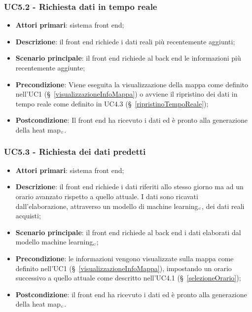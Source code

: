 \subsubsection{UC5.2 - Richiesta dati in tempo reale}\label{richiestaDatiTempoReale}
\begin{itemize}
	\item \textbf{Attori primari}: sistema front end;
	\item \textbf{Descrizione}: il front end richiede i dati reali più recentemente aggiunti;
	\item \textbf{Scenario principale}: il front end richiede al back end le informazioni più recentemente aggiunte;
	\item \textbf{Precondizione}: Viene eseguita la visualizzazione della mappa come definito nell’UC1 (\S~\ref{visualizzazioneInfoMappa}) o avviene il ripristino dei dati in tempo reale come definito in UC4.3 (\S~\ref{ripristinoTempoReale});
	\item \textbf{Postcondizione}: Il front end ha ricevuto i dati ed è pronto alla generazione della heat map$_{\scaleto{G}{3pt}}$. 
\end{itemize}

\subsubsection{UC5.3 - Richiesta dei dati predetti}\label{richiestaDatiPredetti}
\begin{itemize}
	\item \textbf{Attori primari}: sistema front end;
	\item \textbf{Descrizione}: il front end richiede i dati riferiti allo stesso giorno ma ad un orario avanzato rispetto a quello attuale.
	I dati sono ricavati dall’elaborazione, attraverso un modello di machine learning$_{\scaleto{G}{3pt}}$, dei dati reali acquisti;
	\item \textbf{Scenario principale}: il front end richiede al back end i dati elaborati dal modello machine learning$_{\scaleto{G}{3pt}}$;
	\item \textbf{Precondizione}: le informazioni vengono visualizzate sulla mappa come definito nell’UC1 (\S~\ref{visualizzazioneInfoMappa}), impostando un orario successivo a quello attuale come descritto nell’UC4.1 (\S~\ref{selezioneOrario});
	\item \textbf{Postcondizione}: il front end ha ricevuto i dati ed è pronto alla generazione della heat map$_{\scaleto{G}{3pt}}$. 
\end{itemize}


